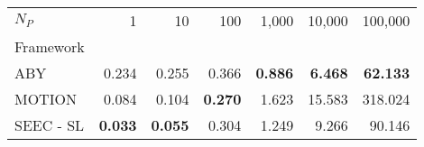 \begin{tabular}{lrrrrrr}
\toprule
$N_P$ & 1 & 10 & 100 & 1,000 & 10,000 & 100,000 \\
Framework &  &  &  &  &  &  \\
\midrule
ABY~\cite{DSZ15} & 0.234 & 0.255 & 0.366 & \bfseries 0.886 & \bfseries 6.468 & \bfseries 62.133 \\
MOTION~\cite{BDST22} & 0.084 & 0.104 & \bfseries 0.270 & 1.623 & 15.583 & 318.024 \\
SEEC - SL & \bfseries 0.033 & \bfseries 0.055 & 0.304 & 1.249 & 9.266 & 90.146 \\
\bottomrule
\end{tabular}
